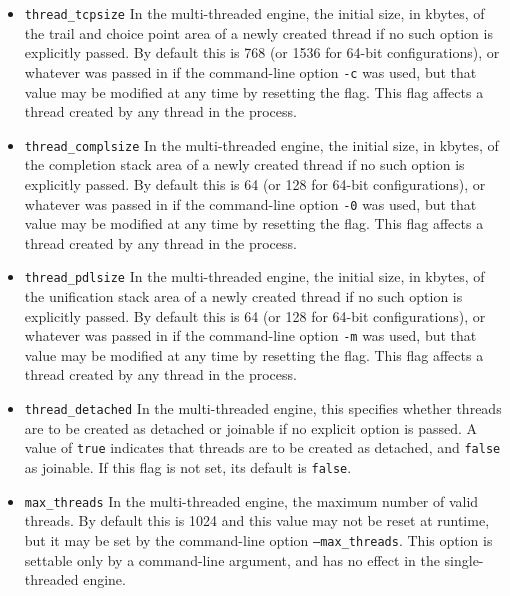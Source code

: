 \begin{description}
\begin{itemize}
\item {\tt thread\_tcpsize} In the multi-threaded engine, the initial
  size, in kbytes, of the trail and choice point area of a newly
  created thread if no such option is explicitly passed.  By default
  this is 768 (or 1536 for 64-bit configurations), or whatever was
  passed in if the command-line option {\tt -c} was used, but that
  value may be modified at any time by resetting the flag.  This flag
  affects a thread created by any thread in the process.

\item {\tt thread\_complsize} In the multi-threaded engine, the
  initial size, in kbytes, of the completion stack area of a newly
  created thread if no such option is explicitly passed.  By default
  this is 64 (or 128 for 64-bit configurations), or whatever was
  passed in if the command-line option {\tt -0} was used, but that
  value may be modified at any time by resetting the flag.  This flag
  affects a thread created by any thread in the process.

\item {\tt thread\_pdlsize} In the multi-threaded engine, the initial
  size, in kbytes, of the unification stack area of a newly created
  thread if no such option is explicitly passed.  By default this is
  64 (or 128 for 64-bit configurations), or whatever was passed in if
  the command-line option {\tt -m} was used, but that value may be
  modified at any time by resetting the flag.  This flag affects a
  thread created by any thread in the process.

\item {\tt thread\_detached} In the multi-threaded engine, this
  specifies whether threads are to be created as detached or joinable
  if no explicit option is passed.  A value of {\tt true} indicates
  that threads are to be created as detached, and {\tt false} as
  joinable.  If this flag is not set, its default is {\tt false}.

\item {\tt max\_threads} In the multi-threaded engine, the maximum
  number of valid threads.  By default this is 1024 and this value may
  not be reset at runtime, but it may be set by the command-line
  option {\tt --max\_threads}.  This option is settable only by a
  command-line argument, and has no effect in the single-threaded
  engine.


\end{itemize}
\end{description}
